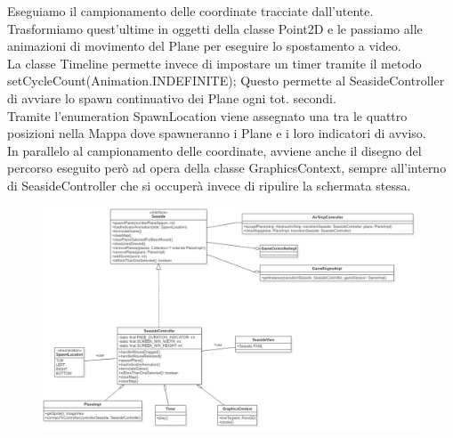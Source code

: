 \documentclass[a4paper,12pt]{report}
\begin{document}
\noindent Eseguiamo il campionamento delle coordinate tracciate dall’utente.
\\
Trasformiamo quest’ultime in oggetti della classe Point2D e le passiamo alle animazioni di movimento del Plane per eseguire lo spostamento a 
video.
\\
La classe Timeline permette invece di impostare un timer tramite il metodo setCycleCount(Animation.INDEFINITE);
Questo permette al SeasideController di avviare lo spawn continuativo dei Plane ogni tot. secondi.
\\
Tramite l’enumeration SpawnLocation viene assegnato una tra le quattro posizioni nella Mappa dove spawneranno i Plane e i loro indicatori di 
avviso.
\\
In parallelo al campionamento delle coordinate, avviene anche il disegno del percorso eseguito però ad opera della classe GraphicsContext,
sempre all’interno di SeasideController che si occuperà invece di ripulire la schermata stessa.
\begin{figure}[H]
    \begin{center}
        \centering
        \includegraphics[width=\textwidth]{img/Design/Rodilosso/SeasideController.png}
    \end{center}
    \label{img:seaside-controller}
\end{figure}
\end{document}
